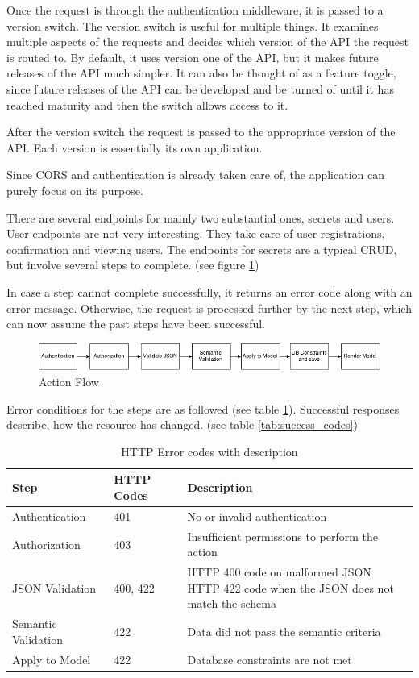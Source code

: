 Once the request is through the authentication middleware, it is passed to a
version switch. The version switch is useful for multiple things. It examines
multiple aspects of the requests and decides which version of the API the
request is routed to. By default, it uses version one of the API, but it makes
future releases of the API much simpler. It can also be thought of as a feature
toggle, since future releases of the API can be developed and be turned of
until it has reached maturity and then the switch allows access to it.

After the version switch the request is passed to the appropriate version of
the API. Each version is essentially its own application.

Since CORS and authentication is already taken care of, the application can
purely focus on its purpose.

There are several endpoints for mainly two substantial ones, secrets and users.
User endpoints are not very interesting. They take care of user registrations,
confirmation and viewing users. The endpoints for secrets are a typical CRUD,
but involve several steps to complete. (see figure \ref{fig:action_flow})

In case a step cannot complete successfully, it returns an error code along
with an error message. Otherwise, the request is processed further by the next
step, which can now assume the past steps have been successful.

\begin{figure}
  \includegraphics[scale=0.50]{pictures/action_flow.png}
  \caption{Action Flow}
  \centering
  \label{fig:action_flow}
\end{figure}

Error conditions for the steps are as followed (see table
\ref{tab:error_codes}). Successful responses describe, how the resource has
changed. (see table \ref{tab:success_codes})

\begin{table}
  \begin{tabular}{|l|l|l|}
    \hline
    Step & HTTP Codes & Description \\ \hline
    Authentication & 401 & No or invalid authentication \\ \hline
    Authorization & 403 & Insufficient permissions to perform the action \\ \hline
    JSON Validation & 400, 422 & \parbox[t]{10cm}{HTTP 400 code on malformed JSON\\HTTP 422 code when the JSON does not match the schema} \\ \hline
    Semantic Validation & 422 & Data did not pass the semantic criteria \\ \hline
    Apply to Model & 422 & Database constraints are not met \\ \hline
  \end{tabular}
  \caption{HTTP Error codes with description}
  \centering
  \label{tab:error_codes}
\end{table}

